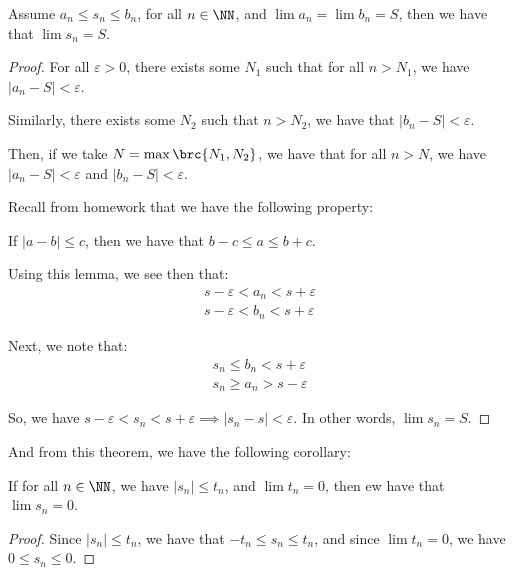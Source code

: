 \documentclass[openany]{book}
\begin{document}
\begin{thm}
	Assume $a_n \leq s_n \leq b_n$, for all $n \in \NN$, and $\lim a_n = \lim b_n = S$, then we have that $\lim s_n = S$. 
\end{thm}
\begin{proof}
	For all $\varepsilon > 0$, there exists some $N_1$ such that for all $n > N_1$, we have $\lvert a_n - S \rvert < \varepsilon$.
	
	Similarly, there exists some $N_2$ such that $n > N_2$, we have that $\lvert b_n - S \rvert < \varepsilon$.
	
	Then, if we take $N = \max\brc{N_1, N_2}$, we have that for all $n > N$, we have $\lvert a_n - S \rvert < \varepsilon$ and $\lvert b_n - S \rvert < \varepsilon$.
	
	Recall from homework that we have the following property:
	\begin{lem}
		If $\lvert a - b \rvert \leq c$, then we have that $b - c \leq a \leq b + c$.
	\end{lem}
	
	Using this lemma, we see then that:
	\begin{align*}
		s - \varepsilon < a_n < s + \varepsilon \\
		s - \varepsilon < b_n < s + \varepsilon
	\end{align*}
	
	Next, we note that:
	\begin{align*}
		s_n \leq b_n < s + \varepsilon \\
		s_n \geq a_n > s-\varepsilon
	\end{align*}
	
	So, we have $s - \varepsilon < s_n < s + \varepsilon \implies \lvert s_n - s \rvert < \varepsilon$. In other words, $\lim s_n = S$.
\end{proof}

And from this theorem, we have the following corollary:
\begin{cor}
	If for all $n \in \NN$, we have $\lvert s_n \rvert \leq t_n$, and $\lim t_n = 0$, then ew have that $\lim s_n = 0$.
\end{cor}
\begin{proof}
	Since $\lvert s_n \rvert \leq t_n$, we have that $-t_n \leq s_n \leq t_n$, and since $\lim t_n = 0$, we have $0 \leq s_n \leq 0$. 
\end{proof}
\end{document}
